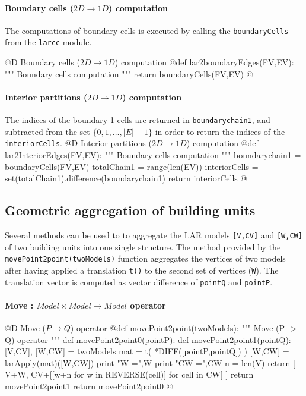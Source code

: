 \documentclass[11pt,oneside]{article}    %
\begin{document}
\paragraph{Boundary cells ($2D\to 1D$) computation}
The computations of boundary cells is executed by calling the \texttt{boundaryCells} from the \texttt{larcc} module.

@D Boundary cells ($2D\to 1D$) computation
@{def lar2boundaryEdges(FV,EV):
    """ Boundary cells computation """
    return boundaryCells(FV,EV)
@}

\paragraph{Interior partitions ($2D\to 1D$) computation}
The indices of the boundary 1-cells are returned in \texttt{boundarychain1}, and subtracted from the set $\{0,1,\ldots,|E|-1\}$ in order to return the indices of the \texttt{interiorCells}.
@D Interior partitions ($2D\to 1D$) computation
@{def lar2InteriorEdges(FV,EV):
    """ Boundary cells computation """
    boundarychain1 = boundaryCells(FV,EV)
    totalChain1 = range(len(EV))
    interiorCells = set(totalChain1).difference(boundarychain1)
    return interiorCells
@}


\subsection{Geometric aggregation of building units}

Several methods can be used to to aggregate the LAR models \texttt{[V,CV]} and  \texttt{[W,CW]} of two building units into one single structure. The method provided by the \texttt{movePoint2point(twoModels)} function aggregates the vertices of two models after having applied a translation \texttt{t()} to the second set of vertices (\texttt{W}). The translation vector is computed as vector difference of \texttt{pointQ}
and \texttt{pointP}.

\paragraph{Move : $Model \times Model \to Model$ operator}
@D Move ($P\to Q$) operator
@{def movePoint2point(twoModels):
    """ Move (P -> Q) operator """
    def movePoint2point0(pointP):
        def movePoint2point1(pointQ):
            [V,CV], [W,CW] = twoModels
            mat = t( *DIFF([pointP,pointQ]) )
            [W,CW] = larApply(mat)([W,CW])
            print "\n W =",W
            print "\n CW =",CW
            n = len(V)
            return [ V+W, CV+[[w+n for w in REVERSE(cell)] for cell in CW] ] 
        return movePoint2point1    
    return movePoint2point0
@}
\end{document}

